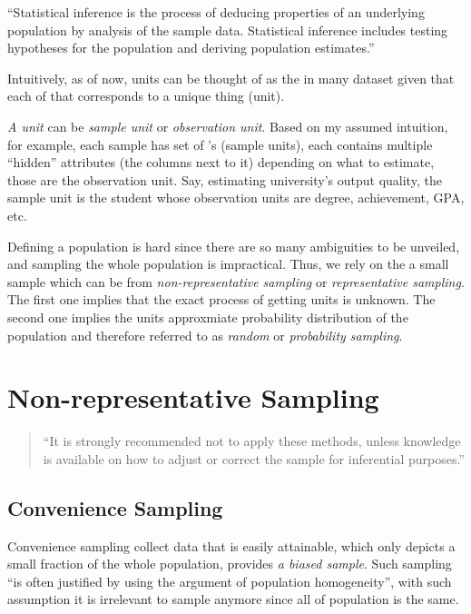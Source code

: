 ``Statistical inference is the process of deducing properties of an underlying population by analysis of the sample data. Statistical inference includes testing hypotheses for the population and deriving population estimates.''

Intuitively, as of now, units can be thought of as the  in many dataset given that each of that corresponds to a unique thing (unit).

\emph{A unit} can be \emph{sample unit} or \emph{observation unit}. Based on my assumed intuition, for example, each sample has set of 's (sample units), each  contains multiple ``hidden'' attributes 
(the columns next to it) depending on what to estimate, those are the observation unit. Say, estimating university's output quality, the sample unit is the student whose observation units are degree, achievement, GPA, etc.

Defining a population is hard since there are so many ambiguities to be unveiled, and sampling the whole population is impractical. Thus, we rely on the a small sample which can be from \emph{non-representative sampling} or 
\emph{representative sampling}. The first one implies that the exact process of getting units is unknown. The second one implies the units approxmiate probability distribution of the population and therefore referred to as 
\emph{random} or \emph{probability sampling}.

\section{Non-representative Sampling}
\begin{quote}
    ``It is strongly recommended not to apply these methods, unless knowledge is available on how to adjust or correct the sample for inferential purposes.''
\end{quote}
\subsection{Convenience Sampling}
Convenience sampling collect data that is easily attainable, which only depicts a small fraction of the whole population, provides \emph{a biased sample}. Such sampling ``is often justified by using the argument of 
population homogeneity'', with such assumption it is irrelevant to sample anymore since all of population is the same.

